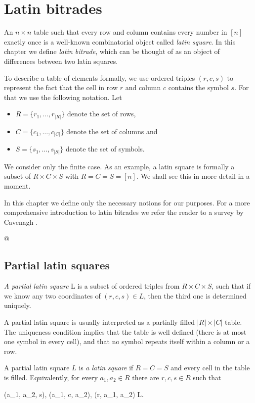\chapter{Latin bitrades}

An $n \times n$ table such that every row and column contains every number in $[n]$ exactly once is a well-known combinatorial object called \emph{latin square}. In this chapter we define \emph{latin bitrade}, which can be thought of as an object of differences between two latin squares.

To describe a table of elements formally, we use ordered triples $(r,c,s)$ to represent the fact that the cell in row $r$ and column $c$ contains the symbol $s$. For that we use the following notation. Let
\begin{itemize}
	\item $R = \{r_1,\dots,r_{|R|}\}$ denote the set of rows,
	\item $C = \{c_1,\dots,c_{|C|}\}$ denote the set of columns and
	\item $S = \{s_1,\dots,s_{|S|}\}$ denote the set of symbols.
\end{itemize}
 We consider only the finite case. As an example, a latin square is formally a subset of $R \times C \times S$ with $R = C = S = [n]$. We shall see this in more detail in a moment.

In this chapter we define only the necessary notions for our purposes. For a more comprehensive introduction to latin bitrades we refer the reader to a survey by Cavenagh \cite{Cavenagh08}.

@

\section{Partial latin squares}

\begin{defn}
\emph{A partial latin square} L is a subset of ordered triples from $R \times C \times S$, such that if we know any two coordinates of $(r,c,s)\in L$, then the third one is determined uniquely.
\end{defn}

A partial latin square is usually interpreted as a partially filled $|R| \times |C|$ table. The uniqueness condition implies that the table is well defined (there is at most one symbol in every cell), and that no symbol repeats itself within a column or a row.

\begin{defn}
A partial latin square $L$ is \emph{a latin square} if $R=C=S$ and every cell in the table is filled. Equivalently, for every $a_1, a_2 \in R$ there are $r,c,s \in R$ such that
\begin{cosyeqnarray}
	(a_1, a_2, s), (a_1, c, a_2), (r, a_1, a_2) \in L.
\end{cosyeqnarray}
\end{defn}

